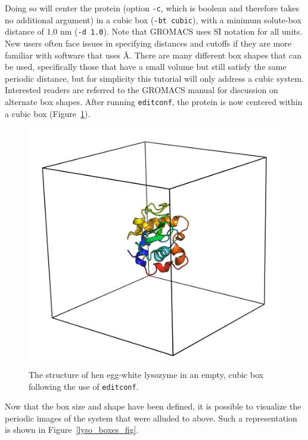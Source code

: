 \documentclass[9pt,tutorial]{livecoms}
\begin{document}
Doing so will center the protein (option \texttt{-c}, which is boolean and therefore takes no additional argument) in a cubic box (\texttt{-bt cubic}), with a minimum solute-box distance of 1.0 nm (\texttt{-d 1.0}). Note that GROMACS uses SI notation for all units. New users often face issues in specifying distances and cutoffs if they are more familiar with software that uses \AA. There are many different box shapes that can be used, specifically those that have a small volume but still satisfy the same periodic distance, but for simplicity this tutorial will only address a cubic system. Interested readers are referred to the GROMACS manual for discussion on alternate box shapes. After running \texttt{editconf}, the protein is now centered within a cubic box (Figure~\ref{lyso_box_fig}).

\begin{figure}[H]
\centering
\includegraphics{1AKI_1box}
\caption{The structure of hen egg-white lysozyme in an empty, cubic box following the use of \texttt{editconf}.}
\label{lyso_box_fig}
\end{figure}

Now that the box size and shape have been defined, it is possible to visualize the periodic images of the system that were alluded to above. Such a representation is shown in Figure~\ref{lyso_boxes_fig}.
\end{document}
